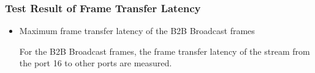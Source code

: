 \subsubsection{Test Result of Frame Transfer Latency}


\begin{itemize}
    \item Maximum frame transfer latency of the B2B Broadcast frames

For the B2B Broadcast frames, the frame transfer latency of the stream from the port 16 to other ports are measured. 
%


\end{itemize}
